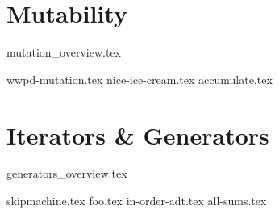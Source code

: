\documentclass{exam}
\begin{document}
\section{Mutability}
	{mutation_overview.tex}
	\begin{questions}
	    {wwpd-mutation.tex}
        {nice-ice-cream.tex}
        {accumulate.tex}
	\end{questions}

\newpage
\section{Iterators \& Generators}
{generators_overview.tex}
\begin{questions}
    {skipmachine.tex}
    {foo.tex}
    {in-order-adt.tex}
    {all-sums.tex}
\end{questions}
\end{document}
